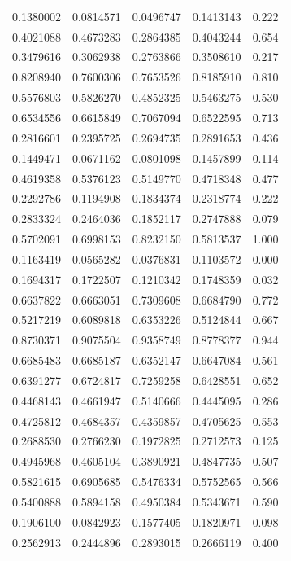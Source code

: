 \documentclass[
  letterpaper,
  DIV=11,
  numbers=noendperiod]{scrartcl}
\begin{document}
\begin{longtable}[]{@{}rrrrr@{}}
0.1380002 & 0.0814571 & 0.0496747 & 0.1413143 & 0.222 \\
0.4021088 & 0.4673283 & 0.2864385 & 0.4043244 & 0.654 \\
0.3479616 & 0.3062938 & 0.2763866 & 0.3508610 & 0.217 \\
0.8208940 & 0.7600306 & 0.7653526 & 0.8185910 & 0.810 \\
0.5576803 & 0.5826270 & 0.4852325 & 0.5463275 & 0.530 \\
0.6534556 & 0.6615849 & 0.7067094 & 0.6522595 & 0.713 \\
0.2816601 & 0.2395725 & 0.2694735 & 0.2891653 & 0.436 \\
0.1449471 & 0.0671162 & 0.0801098 & 0.1457899 & 0.114 \\
0.4619358 & 0.5376123 & 0.5149770 & 0.4718348 & 0.477 \\
0.2292786 & 0.1194908 & 0.1834374 & 0.2318774 & 0.222 \\
0.2833324 & 0.2464036 & 0.1852117 & 0.2747888 & 0.079 \\
0.5702091 & 0.6998153 & 0.8232150 & 0.5813537 & 1.000 \\
0.1163419 & 0.0565282 & 0.0376831 & 0.1103572 & 0.000 \\
0.1694317 & 0.1722507 & 0.1210342 & 0.1748359 & 0.032 \\
0.6637822 & 0.6663051 & 0.7309608 & 0.6684790 & 0.772 \\
0.5217219 & 0.6089818 & 0.6353226 & 0.5124844 & 0.667 \\
0.8730371 & 0.9075504 & 0.9358749 & 0.8778377 & 0.944 \\
0.6685483 & 0.6685187 & 0.6352147 & 0.6647084 & 0.561 \\
0.6391277 & 0.6724817 & 0.7259258 & 0.6428551 & 0.652 \\
0.4468143 & 0.4661947 & 0.5140666 & 0.4445095 & 0.286 \\
0.4725812 & 0.4684357 & 0.4359857 & 0.4705625 & 0.553 \\
0.2688530 & 0.2766230 & 0.1972825 & 0.2712573 & 0.125 \\
0.4945968 & 0.4605104 & 0.3890921 & 0.4847735 & 0.507 \\
0.5821615 & 0.6905685 & 0.5476334 & 0.5752565 & 0.566 \\
0.5400888 & 0.5894158 & 0.4950384 & 0.5343671 & 0.590 \\
0.1906100 & 0.0842923 & 0.1577405 & 0.1820971 & 0.098 \\
0.2562913 & 0.2444896 & 0.2893015 & 0.2666119 & 0.400 \\

\end{longtable}
\end{document}
